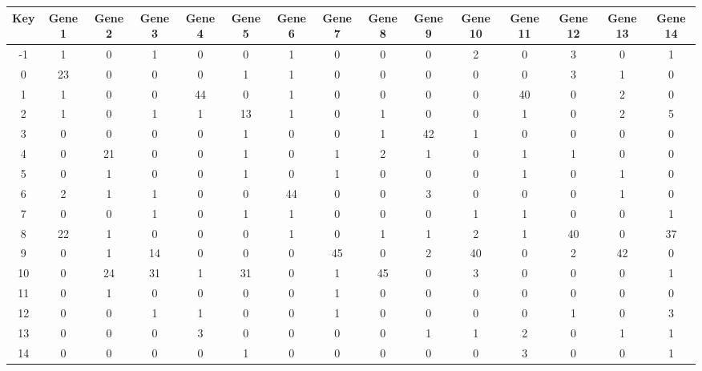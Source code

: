 \begin{tabular}{|c|c|c|c|c|c|c|c|c|c|c|c|c|c|c|}
\hline
Key & Gene 1 & Gene 2 & Gene 3 & Gene 4 & Gene 5 & Gene 6 & Gene 7 & Gene 8 & Gene 9 & Gene 10 & Gene 11 & Gene 12 & Gene 13 & Gene 14 \\
\hline
-1 & 1 & 0 & 1 & 0 & 0 & 1 & 0 & 0 & 0 & 2 & 0 & 3 & 0 & 1 \\
0 & 23 & 0 & 0 & 0 & 1 & 1 & 0 & 0 & 0 & 0 & 0 & 3 & 1 & 0 \\
1 & 1 & 0 & 0 & 44 & 0 & 1 & 0 & 0 & 0 & 0 & 40 & 0 & 2 & 0 \\
2 & 1 & 0 & 1 & 1 & 13 & 1 & 0 & 1 & 0 & 0 & 1 & 0 & 2 & 5 \\
3 & 0 & 0 & 0 & 0 & 1 & 0 & 0 & 1 & 42 & 1 & 0 & 0 & 0 & 0 \\
4 & 0 & 21 & 0 & 0 & 1 & 0 & 1 & 2 & 1 & 0 & 1 & 1 & 0 & 0 \\
5 & 0 & 1 & 0 & 0 & 1 & 0 & 1 & 0 & 0 & 0 & 1 & 0 & 1 & 0 \\
6 & 2 & 1 & 1 & 0 & 0 & 44 & 0 & 0 & 3 & 0 & 0 & 0 & 1 & 0 \\
7 & 0 & 0 & 1 & 0 & 1 & 1 & 0 & 0 & 0 & 1 & 1 & 0 & 0 & 1 \\
8 & 22 & 1 & 0 & 0 & 0 & 1 & 0 & 1 & 1 & 2 & 1 & 40 & 0 & 37 \\
9 & 0 & 1 & 14 & 0 & 0 & 0 & 45 & 0 & 2 & 40 & 0 & 2 & 42 & 0 \\
10 & 0 & 24 & 31 & 1 & 31 & 0 & 1 & 45 & 0 & 3 & 0 & 0 & 0 & 1 \\
11 & 0 & 1 & 0 & 0 & 0 & 0 & 1 & 0 & 0 & 0 & 0 & 0 & 0 & 0 \\
12 & 0 & 0 & 1 & 1 & 0 & 0 & 1 & 0 & 0 & 0 & 0 & 1 & 0 & 3 \\
13 & 0 & 0 & 0 & 3 & 0 & 0 & 0 & 0 & 1 & 1 & 2 & 0 & 1 & 1 \\
14 & 0 & 0 & 0 & 0 & 1 & 0 & 0 & 0 & 0 & 0 & 3 & 0 & 0 & 1 \\
\hline
\end{tabular}